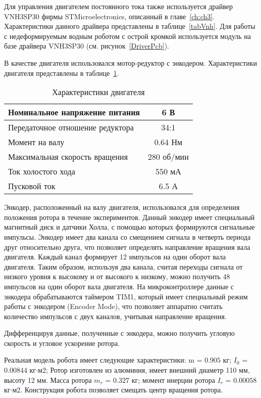 Для управления двигателем постоянного тока также используется драйвер VNH3SP30 фирмы STMicroelectronics, описанный в главе~\ref{ch:ch3}. Характеристики данного драйвера представлены в таблице~\ref{tabVnh}. Для работы с недеформируемым водным роботом с острой кромкой используется модуль на базе драйвера VNH3SP30 (см. рисунок~\ref{DriverPcb}). 


В качестве двигателя использовался мотор-редуктор с энкодером. Характеристики двигателя представлены в таблице~\ref{tabMotor2}. 

\begin{table}[h]
	\centering
	\caption{Характеристики двигателя}\label{tabMotor2}
	\begin{tabular}{|l|c|}
		\hline
		Номинальное напряжение питания & 6 В \\ \hline
		Передаточное отношение редуктора & 34:1 \\ \hline
		Момент на валу & 0.64 Нм\\ \hline
		Максимальная скорость вращения & 280 об/мин \\ \hline
		Ток холостого хода & 550 мА\\ \hline
		Пусковой ток & 6.5 А \\ \hline
	\end{tabular}
\end{table}


Энкодер, расположенный на валу двигателя, использовался для определения положения ротора в течение экспериментов. Данный энкодер имеет специальный магнитный диск и датчики Холла, с помощью которых формируются сигнальные импульсы. Энкодер имеет два канала со смещением сигнала в четверть периода друг относительно друга, что позволяет определять направление вращения вала двигателя. Каждый канал формирует 12 импульсов на один оборот вала двигателя. Таким образом, используя два канала, считая переходы сигнала от низкого уровня к высокому и от высокого к низкому, можно получить 48 импульсов на один оборот вала двигателя. На микроконтроллере данные с энкодера обрабатываются таймером TIM1, который имеет специальный режим работы с энкодером (Encoder Mode), что позволяет аппаратно считать количество импульсов с двух каналов, учитывая направление вращения. 

Дифференцируя данные, полученные с энкодера, можно получить угловую скорость и угловое ускорение ротора.






Реальная модель робота имеет следующие характеристики: m = $0.905$ кг; $I_0$ = $0.00844$ кг$\cdot$м2; Ротор изготовлен из алюминия, имеет внешний диаметр 110 мм, высоту 12 мм. Масса ротора $m_r$ = $0.327$ кг; момент инерции ротора $I_r$ = $0.00058$ кг$\cdot$м2. Конструкция робота позволяет смещать центр вращения ротора.

